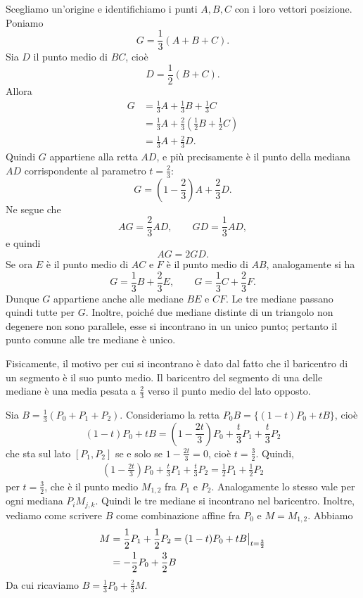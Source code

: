 \documentclass[a4paper]{article}
\begin{document}
\begin{snippetproof}{}
    Scegliamo un'origine e identifichiamo i punti \(A,B,C\) con i loro vettori posizione. Poniamo
    \[
        G = \frac13(A+B+C).
    \]
    Sia \(D\) il punto medio di \(BC\), cioè
    \[
        D = \frac12(B+C).
    \]
    Allora
    \begin{align*}
        G &= \frac13 A + \frac13 B + \frac13 C \\
          &= \frac13 A + \frac23 \left(\frac12B+\frac12C\right) \\
          &= \frac13 A + \frac23 D.
    \end{align*}
    Quindi \(G\) appartiene alla retta \(AD\), e più precisamente è il punto della mediana \(AD\) corrispondente al parametro \(t=\frac23\):
    \[
        G = \left(1-\frac23\right)A+\frac23D.
    \]
    Ne segue che
    \[
        AG = \frac23AD,
        \qquad
        GD = \frac13AD,
    \]
    e quindi
    \[
        AG = 2GD.
    \]
    Se ora \(E\) è il punto medio di \(AC\) e \(F\) è il punto medio di \(AB\), analogamente si ha
    \[
        G = \frac13B+\frac23E,
        \qquad
        G = \frac13C+\frac23F.
    \]
    Dunque \(G\) appartiene anche alle mediane \(BE\) e \(CF\). Le tre mediane passano quindi tutte per \(G\). Inoltre, poiché due mediane distinte di un triangolo non degenere non sono parallele, esse si incontrano in un unico punto; pertanto il punto comune alle tre mediane è unico.
\end{snippetproof}

Fisicamente, il motivo per cui si incontrano
è dato dal fatto che il baricentro di un segmento è il suo punto medio.
Il baricentro del segmento di una delle mediane è una media pesata a \(\frac23\)
verso il punto medio del lato opposto.

\begin{snippetproof}{}
    Sia \(B = \frac13(P_0 + P_1 + P_2)\).
    Consideriamo la retta \(P_0B = \{(1-t)P_0 + tB\}\), cioè
    \[
        (1-t)P_0+tB =
        \left(1 - \frac{2t}{3}\right)P_0 + \frac{t}{3}P_1 + \frac{t}{3}P_2
    \]
    che sta sul lato \([P_1, P_2]\) se e solo se \(1-\frac{2t}{3} = 0\),
    cioè \(t = \frac32\). Quindi,
    \begin{align*}
        \left(1 - \frac{2t}{3}\right)P_0 + \frac{t}{3}P_1 + \frac{t}{3}P_2
        = \frac{1}{2}P_1 + \frac{1}{2}P_2
    \end{align*}
    per \(t=\frac32\), che è il punto medio \(M_{1,2}\) fra \(P_1\) e \(P_2\).
    Analogamente lo stesso vale per ogni mediana \(P_i M_{j,k}\).
    Quindi le tre mediane si incontrano nel baricentro.
    Inoltre, vediamo come scrivere \(B\) come combinazione affine fra \(P_0\)
    e \(M = M_{1,2}\). Abbiamo
    \begin{align*}
        M &= \frac{1}{2}P_1 + \frac{1}{2}P_2 = \restr{
            (1-t)P_0 + tB
        }{t=\frac32} \\
        &= -\frac12 P_0 + \frac32 B
    \end{align*}
    Da cui ricaviamo \(B = \frac13 P_0 + \frac23 M\).
\end{snippetproof}
\end{document}
